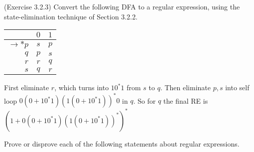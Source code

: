\documentclass[10pt]{homework}
\begin{document}
\begin{problem} (Exercise 3.2.3)
  Convert the following DFA to a regular expression, using the state-elimination
  technique of Section 3.2.2.
  \begin{table}[h]
    \centering
    \begin{tabular}{r||c|c} %
      & $0$ & $1$\\\hline\hline %
      $\rightarrow * p$ & $s$ & $p$\\
      $q$ & $p$ & $s$\\
      $r$ & $r$ & $q$\\
      $s$ & $q$ & $r$
    \end{tabular}
  \end{table}
\end{problem}

\begin{solution}
    First eliminate $r$, which turns into $10^{*}1$ from $s$ to $q$. Then eliminate $p,s$ into self loop $0(0+10^{*}1)(1(0+10^{*}1))^{*}0$ in $q$. So for $q$ the final RE is $(1+0(0+10^{*}1)(1(0+10^{*}1))^{*})^{*}$
\end{solution}

\begin{problem}
  Prove or disprove each of the following statements about regular expressions.
\end{problem}

\begin{solution}
\end{solution}
\end{document}
